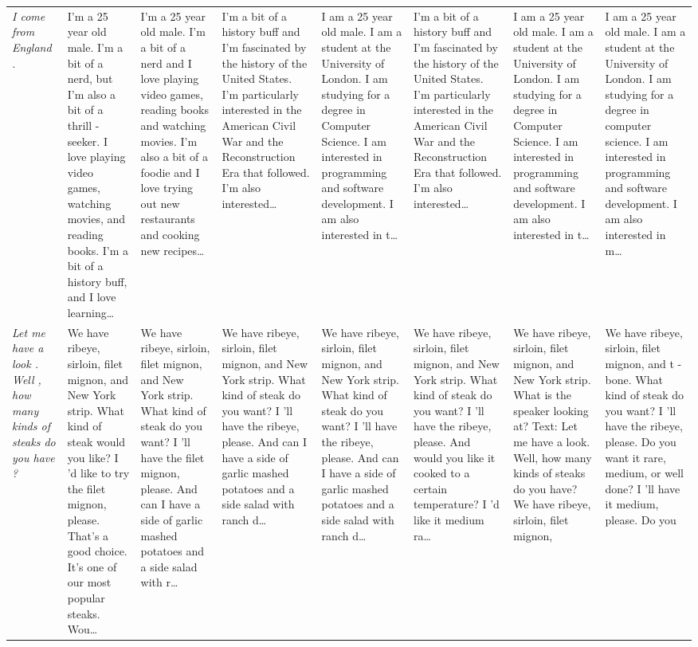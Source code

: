 \begin{table}[t]
\begin{tabularx}{\textwidth}{p{} X X X X X X X}
\textit{I come from England .} & I'm a 25 year old male. I'm a bit of a nerd, but I'm also a bit of a thrill - seeker. I love playing video games, watching movies, and reading books. I'm a bit of a history buff, and I love learning… & I'm a 25 year old male. I'm a bit of a nerd and I love playing video games, reading books and watching movies. I'm also a bit of a foodie and I love trying out new restaurants and cooking new recipes… & I'm a bit of a history buff and I'm fascinated by the history of the United States. I'm particularly interested in the American Civil War and the Reconstruction Era that followed. I'm also interested… & I am a 25 year old male. I am a student at the University of London. I am studying for a degree in Computer Science. I am interested in programming and software development. I am also interested in t… & I'm a bit of a history buff and I'm fascinated by the history of the United States. I'm particularly interested in the American Civil War and the Reconstruction Era that followed. I'm also interested… & I am a 25 year old male. I am a student at the University of London. I am studying for a degree in Computer Science. I am interested in programming and software development. I am also interested in t… & I am a 25 year old male. I am a student at the University of London. I am studying for a degree in computer science. I am interested in programming and software development. I am also interested in m… \\
\textit{Let me have a look . Well , how many kinds of steaks do you have ?} & We have ribeye, sirloin, filet mignon, and New York strip. What kind of steak would you like? I 'd like to try the filet mignon, please. That's a good choice. It's one of our most popular steaks. Wou… & We have ribeye, sirloin, filet mignon, and New York strip. What kind of steak do you want? I 'll have the filet mignon, please. And can I have a side of garlic mashed potatoes and a side salad with r… & We have ribeye, sirloin, filet mignon, and New York strip. What kind of steak do you want? I 'll have the ribeye, please. And can I have a side of garlic mashed potatoes and a side salad with ranch d… & We have ribeye, sirloin, filet mignon, and New York strip. What kind of steak do you want? I 'll have the ribeye, please. And can I have a side of garlic mashed potatoes and a side salad with ranch d… & We have ribeye, sirloin, filet mignon, and New York strip. What kind of steak do you want? I 'll have the ribeye, please. And would you like it cooked to a certain temperature? I 'd like it medium ra… & We have ribeye, sirloin, filet mignon, and New York strip. What is the speaker looking at? Text: Let me have a look. Well, how many kinds of steaks do you have? We have ribeye, sirloin, filet mignon, & We have ribeye, sirloin, filet mignon, and t - bone. What kind of steak do you want? I 'll have the ribeye, please. Do you want it rare, medium, or well done? I 'll have it medium, please. Do you \\

\end{tabularx}
\end{table}
